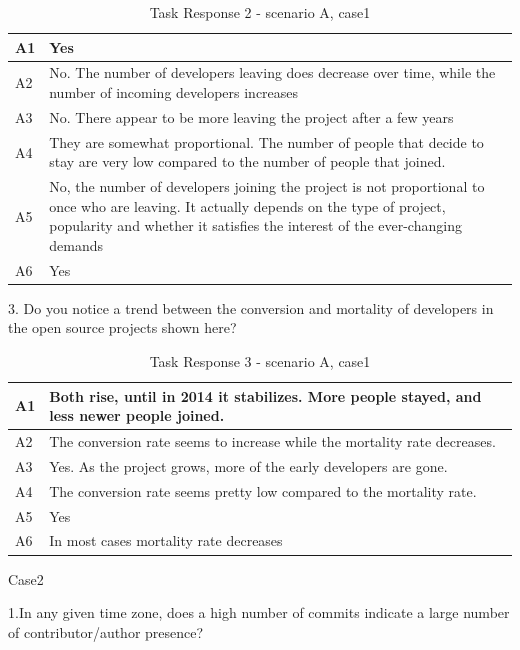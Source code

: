 \documentclass[double,12pt]{beavtex}
\begin{document}
\begin{appendices}
\begin{table}[H]
\begin{tabular}{ |p{2cm}|p{12cm}| }
 \hline
 A1 & Yes\\
 \hline
 A2 & No. The number of developers leaving does decrease over time, while the number of incoming developers increases\\ \hline
 A3 & No. There appear to be more leaving the project after a few years\\ \hline
 A4 & They are somewhat proportional. The number of people that decide to stay are very low compared to the number of people that joined.\\ \hline
 A5 & No, the number of developers joining the project is not proportional to once who are leaving. It actually depends on the type of project, popularity and whether it satisfies the interest of the ever-changing demands\\ \hline
 A6 & Yes\\
 \hline
\end{tabular}
\caption{Task Response 2 - scenario A, case1}
\label{tab:table2}
\end{table}


3. Do you notice a trend between the conversion and mortality of developers in the open source projects shown here?

\begin{table}[H]
\begin{tabular}{ |p{2cm}|p{12cm}| }
 \hline
 A1 & Both rise, until in 2014 it stabilizes. More people stayed, and less newer people joined.\\
 \hline
 A2 & The conversion rate seems to increase while the mortality rate decreases.\\ \hline
 A3 & Yes. As the project grows, more of the early developers are gone.\\ \hline
 A4 & The conversion rate seems pretty low compared to the mortality rate.\\ \hline
 A5 & Yes\\ \hline
 A6 & In most cases mortality rate decreases\\
 \hline
\end{tabular}
\caption{Task Response 3 - scenario A, case1}
\label{tab:table3}
\end{table}

Case2

1.In any given time zone, does a high number of commits indicate a large number of contributor/author presence?


\end{appendices}
\end{document}
